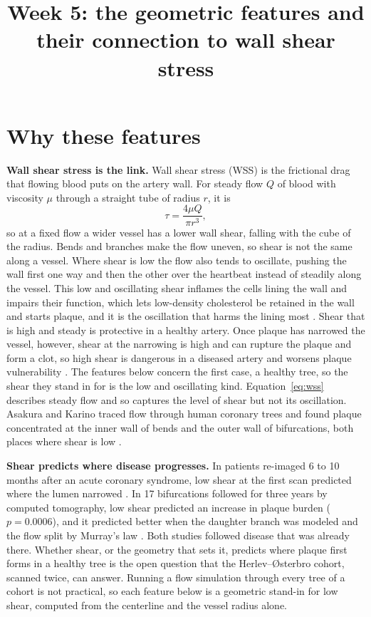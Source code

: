 \documentclass[11pt,a4paper]{article}
\title{Week 5: the geometric features and their connection to wall shear stress}
\author{}
\date{}
\begin{document}
\maketitle

\section{Why these features}

\textbf{Wall shear stress is the link.} Wall shear stress (WSS) is the frictional drag that flowing blood puts on the artery wall.
For steady flow $Q$ of blood with viscosity $\mu$ through a straight tube of radius $r$, it is
\begin{equation}
  \tau = \frac{4\mu Q}{\pi r^{3}},
  \label{eq:wss}
\end{equation}
so at a fixed flow a wider vessel has a lower wall shear, falling with the cube of the radius.
Bends and branches make the flow uneven, so shear is not the same along a vessel.
Where shear is low the flow also tends to oscillate, pushing the wall first one way and then the other over the heartbeat instead of steadily along the vessel.
This low and oscillating shear inflames the cells lining the wall and impairs their function, which lets low-density cholesterol be retained in the wall and starts plaque, and it is the oscillation that harms the lining most \cite{chatzizisis2007ess}.
Shear that is high and steady is protective in a healthy artery.
Once plaque has narrowed the vessel, however, shear at the narrowing is high and can rupture the plaque and form a clot, so high shear is dangerous in a diseased artery and worsens plaque vulnerability \cite{bajraktari2021highwss}.
The features below concern the first case, a healthy tree, so the shear they stand in for is the low and oscillating kind.
Equation~\ref{eq:wss} describes steady flow and so captures the level of shear but not its oscillation.
Asakura and Karino traced flow through human coronary trees and found plaque concentrated at the inner wall of bends and the outer wall of bifurcations, both places where shear is low \cite{asakura1990flow}.

\textbf{Shear predicts where disease progresses.} In patients re-imaged 6 to 10 months after an acute coronary syndrome, low shear at the first scan predicted where the lumen narrowed \cite{stone2012prediction}.
In 17 bifurcations followed for three years by computed tomography, low shear predicted an increase in plaque burden ($p = 0.0006$), and it predicted better when the daughter branch was modeled and the flow split by Murray's law \cite{sakellarios2017bifurcation}.
Both studies followed disease that was already there.
Whether shear, or the geometry that sets it, predicts where plaque first forms in a healthy tree is the open question that the Herlev--{\O}sterbro cohort, scanned twice, can answer.
Running a flow simulation through every tree of a cohort is not practical, so each feature below is a geometric stand-in for low shear, computed from the centerline and the vessel radius alone.
\end{document}
